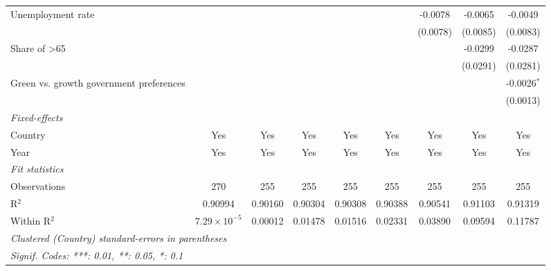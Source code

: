 \begin{table}[htbp]
\begin{tabular}{lcccccccc}
      Unemployment rate                                          &                       &          &          &          &          & -0.0078  & -0.0065  & -0.0049\\   
                                                                 &                       &          &          &          &          & (0.0078) & (0.0085) & (0.0083)\\   
      Share of >65                                               &                       &          &          &          &          &          & -0.0299  & -0.0287\\   
                                                                 &                       &          &          &          &          &          & (0.0291) & (0.0281)\\   
      Green vs. growth government preferences                    &                       &          &          &          &          &          &          & -0.0026$^{*}$\\   
                                                                 &                       &          &          &          &          &          &          & (0.0013)\\   
      \midrule
      \emph{Fixed-effects}\\
      Country                                                    & Yes                   & Yes      & Yes      & Yes      & Yes      & Yes      & Yes      & Yes\\  
      Year                                                       & Yes                   & Yes      & Yes      & Yes      & Yes      & Yes      & Yes      & Yes\\  
      \midrule
      \emph{Fit statistics}\\
      Observations                                               & 270                   & 255      & 255      & 255      & 255      & 255      & 255      & 255\\  
      R$^2$                                                      & 0.90994               & 0.90160  & 0.90304  & 0.90308  & 0.90388  & 0.90541  & 0.91103  & 0.91319\\  
      Within R$^2$                                               & $7.29\times 10^{-5}$  & 0.00012  & 0.01478  & 0.01516  & 0.02331  & 0.03890  & 0.09594  & 0.11787\\  
      \midrule \midrule
      \multicolumn{9}{l}{\emph{Clustered (Country) standard-errors in parentheses}}\\
      \multicolumn{9}{l}{\emph{Signif. Codes: ***: 0.01, **: 0.05, *: 0.1}}\\
   \end{tabular}
\end{table}


